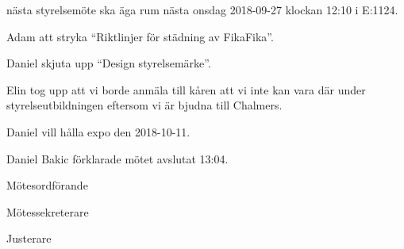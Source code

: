 \documentclass[10pt]{article}
\def\mo{Daniel Bakic}
\def\ms{Axel Voss}
\def\ji{Magnus Lundh}
\begin{document}
\begin{paragrafer}
    \Mbaby


    \Mba nästa styrelsemöte ska äga rum nästa onsdag 2018-09-27 klockan 12:10 i E:1124.
    
    
    Adam \ypa att stryka ``Riktlinjer för städning av FikaFika''.

    \Mbaby 	

    Daniel \ypa skjuta upp ``Design styrelsemärke''.

    \Mbaby  

    Elin tog upp att vi borde anmäla till kåren att vi inte kan vara där under styrelseutbildningen eftersom vi är bjudna till Chalmers. 

    Daniel vill hålla expo den 2018-10-11.

    {\mo} förklarade mötet avslutat 13:04.
\end{paragrafer}
    
\hidesignfoot
\begin{signatures}{3}
    \signature{\mo}{Mötesordförande}
    \signature{\ms}{Mötessekreterare}
    \signature{\ji}{Justerare}
\end{signatures}
\end{document}
